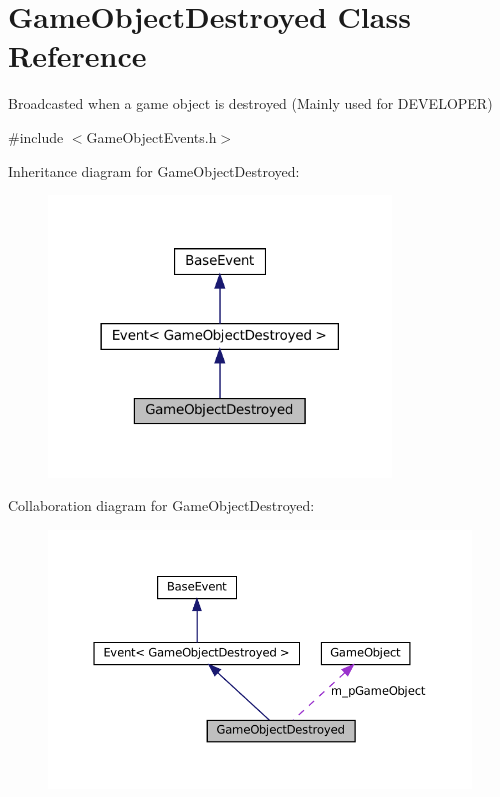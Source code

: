 \hypertarget{classGameObjectDestroyed}{}\section{Game\+Object\+Destroyed Class Reference}
\label{classGameObjectDestroyed}


Broadcasted when a game object is destroyed (Mainly used for D\+E\+V\+E\+L\+O\+P\+ER)  




{\ttfamily \#include $<$Game\+Object\+Events.\+h$>$}



Inheritance diagram for Game\+Object\+Destroyed\+:
\nopagebreak
\begin{figure}[H]
\begin{center}
\leavevmode
\includegraphics[width=258pt]{classGameObjectDestroyed__inherit__graph}
\end{center}
\end{figure}


Collaboration diagram for Game\+Object\+Destroyed\+:
\nopagebreak
\begin{figure}[H]
\begin{center}
\leavevmode
\includegraphics[width=350pt]{classGameObjectDestroyed__coll__graph}
\end{center}
\end{figure}
